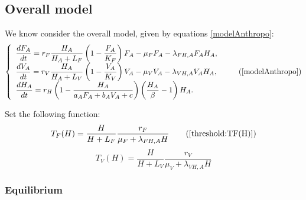 \documentclass{article}
\newcommand{\lfa}{\lambda_{FH, A}}
\newcommand{\lva}{\lambda_{VH, A}}
\begin{document}
\subsection{Overall model}
We know consider the overall model, given by equations \eqref{modelAnthropo}:
\begin{equation}
\left\{ \begin{array}{l}
\dfrac{dF_{A}}{dt}=r_F\dfrac{H_A}{H_A + L_F} \left(1-\dfrac{F_A}{K_{F}}\right)F_A-\mu_{F}F_A-\lambda_{FH,A}F_AH_A,\\
\dfrac{dV_A}{dt}=r_{V}\dfrac{H_A}{H_A+L_{V}}\left(1-\dfrac{V_A}{K_{V}}\right)V_A-\mu_{V}V_A-\lambda_{VH,A}V_AH_A,\\
\dfrac{dH_A}{dt}=r_{H}\left(1-\dfrac{H_A}{a_{A}F_{A}+b_{A}V_{A}+c}\right)\left(\dfrac{H_A}{\beta}-1\right)H_A.
\end{array}\right.
\tag{\ref{modelAnthropo}}
\end{equation}

Set the following function:
\begin{equation}
T_F(H) = \dfrac{H}{H + L_F}\dfrac{r_F}{\mu_F + \lfa H}
\tag{\ref{threshold:TF(H)}}
\end{equation}
\begin{equation}
T_V(H) = \dfrac{H}{H + L_V} \dfrac{r_V}{\mu_V + \lva H}
\label{threshold:TV(H)}
\end{equation}


\subsubsection{Equilibrium}
\end{document}
